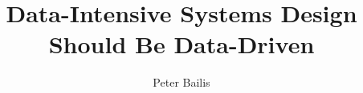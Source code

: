 \documentclass{sig-alternate}
\let\footnotesize\small
\theoremstyle{definition}
\theoremstyle{remark}
\begin{document}
\thispagestyle{empty}


%


\title{Data-Intensive Systems Design Should Be Data-Driven}

\author{Peter Bailis\\}

\maketitle



\footnotesize
 
\end{document}
